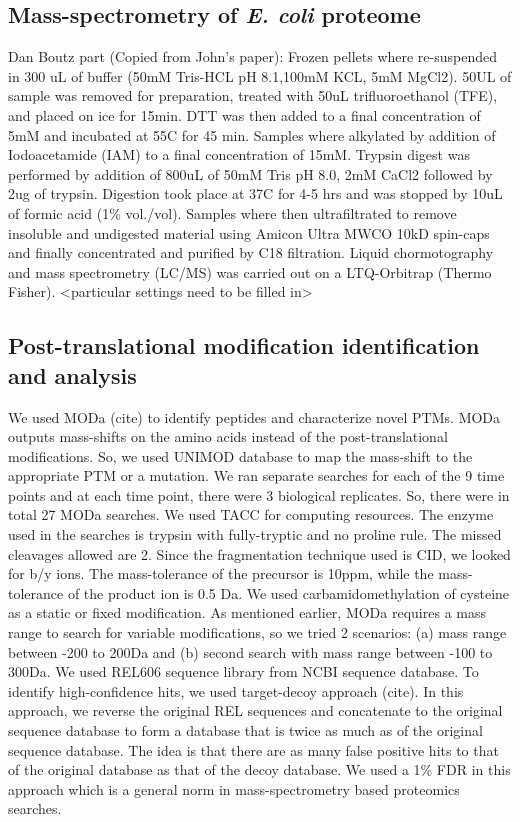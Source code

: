 \documentclass[12pt]{article}
\begin{document}
\subsection{Mass-spectrometry of \emph{E. coli} proteome} 
Dan Boutz part (Copied from John’s paper):
Frozen pellets where re-suspended in 300 uL of buffer (50mM Tris-HCL pH 8.1,100mM KCL, 5mM MgCl2). 50UL of sample was removed for preparation, treated with 50uL trifluoroethanol (TFE), and placed on ice for 15min. DTT was then added to a final concentration of 5mM and incubated at 55C for 45 min. Samples where alkylated by addition of Iodoacetamide (IAM) to a final concentration of 15mM. Trypsin digest was performed by addition of 800uL of 50mM Tris pH 8.0, 2mM CaCl2 followed by 2ug of trypsin. Digestion took place at 37C for 4-5 hrs and was stopped by 10uL of formic acid (1\% vol./vol). Samples where then ultrafiltrated to remove insoluble and undigested material using Amicon Ultra MWCO 10kD spin-caps and finally concentrated and purified by C18 filtration. 
Liquid chormotography and mass spectrometry (LC/MS) was carried out on a LTQ-Orbitrap (Thermo Fisher). <particular settings need to be filled in>

\subsection{Post-translational modification identification and analysis} 
We used MODa (cite) to identify peptides and characterize novel PTMs. MODa outputs mass-shifts on the amino acids instead of the post-translational modifications. So, we used UNIMOD database to map the mass-shift to the appropriate PTM or a mutation. We ran separate searches for each of the 9 time points and at each time point, there were 3 biological replicates. So, there were in total 27 MODa searches. We used TACC for computing resources. The enzyme used in the searches is trypsin with fully-tryptic and no proline rule. The missed cleavages allowed are 2. Since the fragmentation technique used is CID, we looked for b/y ions. The mass-tolerance of the precursor is 10ppm, while the mass-tolerance of the product ion is 0.5 Da. We used carbamidomethylation of cysteine as a static or fixed modification. As mentioned earlier, MODa requires a mass range to search for variable modifications, so we tried 2 scenarios: (a) mass range between -200 to 200Da and (b) second search with mass range between -100 to 300Da. We used REL606 sequence library from NCBI sequence database. To identify high-confidence hits, we used target-decoy approach (cite). In this approach, we reverse the original REL sequences and concatenate to the original sequence database to form a database that is twice as much as of the original sequence database. The idea is that there are as many false positive hits to that of the original database as that of the decoy database. We used a 1\% FDR in this approach which is a general norm in mass-spectrometry based proteomics searches.
\end{document}
